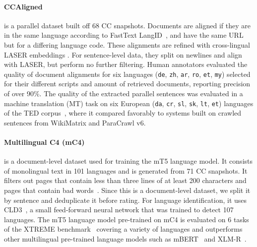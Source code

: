 
\paragraph{CCAligned~\citep{el-kishky-etal-2020-ccaligned}}is a %
parallel dataset built off 68 CC snapshots. Documents are aligned if they are in the same language according to FastText LangID~\citep{joulin-etal-2016-fasttext,joulin-etal-2017-bag}, and have the same URL but for a differing language code. These alignments are refined with cross-lingual LASER embeddings \citep{artetxe-schwenk-2019-massively}. For sentence-level data, they split on newlines and align with LASER, but perform no further filtering.
Human annotators evaluated the quality of document alignments for six languages (\texttt{de}, \texttt{zh}, \texttt{ar}, \texttt{ro}, \texttt{et}, \texttt{my}) selected for their different scripts and amount of retrieved documents, reporting precision of over 90\%.
The quality of the extracted parallel sentences was evaluated in a machine translation (MT) task on six European (\texttt{da}, \texttt{cr}, \texttt{sl}, \texttt{sk}, \texttt{lt}, \texttt{et}) languages of the TED corpus~\citep{qi-etal-2018-pre}, where it compared favorably to systems built on crawled sentences from WikiMatrix and ParaCrawl v6. %

\paragraph{Multilingual C4 (mC4)~\citep{xue-etal-2021-mt5}} is a document-level dataset used for training the mT5 language model. It consists of monolingual text in 101 languages and is generated from 71 CC snapshots. It filters out pages that contain less than three lines of at least 200 characters and pages that contain bad words~\citep{emerick-2018-list}. Since this is a document-level dataset, we split it by sentence and deduplicate it before rating. For language identification, it uses CLD3~\citep{botha-etal-2017-natural}, a small feed-forward neural network that was trained to detect 107 languages.
The mT5 language model pre-trained on mC4
is evaluated on 6 tasks of the XTREME benchmark~\citep{hu-etal-2020-xtreme} covering a variety of languages and outperforms other multilingual pre-trained language models such as mBERT~\citep{devlin-etal-2019-bert} and XLM\nobreakdash-R~\citep{conneau-etal-2020-unsupervised}.%


